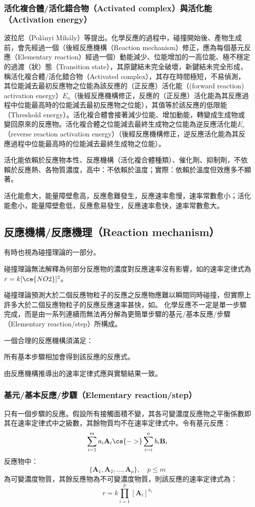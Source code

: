 \documentclass[a4paper,12pt]{report}
\begin{document}
\subsubsection{活化複合體/活化錯合物（Activated complex）與活化能（Activation energy）}
波拉尼（Polányi Mihály）等提出。化學反應的過程中，碰撞開始後、產物生成前，會先經過一個（後經反應機構（Reaction mechanism）修正，應為每個基元反應（Elementary reaction）經過一個）動能減少、位能增加的一高位能、極不穩定的過渡（狀）態（Transition state），其原鍵結未完全破壞，新鍵結未完全形成，稱活化複合體/活化錯合物（Activated complex），其存在時間極短，不易偵測，其位能減去最初反應物之位能為該反應的（正反應）活化能（(forward reaction) activation energy）$E_a$（後經反應機構修正，反應的（正反應）活化能為其反應過程中位能最高時的位能減去最初反應物之位能），其值等於該反應的低限能（Threshold energy）。活化複合體會接著減少位能、增加動能，轉變成生成物或變回原來的反應物。活化複合體之位能減去最終生成物之位能為逆反應活化能$E_r$（reverse reaction activation energy）（後經反應機構修正，逆反應活化能為其反應過程中位能最高時的位能減去最終生成物之位能）。

活化能依賴於反應物本性、反應機構（活化複合體種類）、催化劑、抑制劑，不依賴於反應熱、各物質濃度，高中：不依賴於溫度；實際：依賴於溫度但效應多不顯著。

活化能愈大，能量障壁愈高，反應愈難發生，反應速率愈慢，速率常數愈小；活化能愈小，能量障壁愈低，反應愈易發生，反應速率愈快，速率常數愈大。
\subsection{反應機構/反應機理（Reaction mechanism）}
有時也視為碰撞理論的一部分。
\bit
\item 碰撞理論無法解釋為何部分反應物的濃度對反應速率沒有影響，如的速率定律式為$r=k[\ce{NO2}]^2$。
\item 碰撞理論預測大於二個反應物粒子的反應之反應物應難以瞬間同時碰撞，但實際上許多大於二個反應物粒子的反應反應速率甚快，如。
\eit
{}
化學反應不一定是單一步驟完成，而是由一系列連續而無法再分解為更簡單步驟的基元/基本反應/步驟（Elementary reaction/step）所構成。

一個合理的反應機構須滿足：
\bit
\item 所有基本步驟相加會得到該反應的反應式。
\item 由反應機構推導出的速率定律式應與實驗結果一致。
\eit
\subsubsection{基元/基本反應/步驟（Elementary reaction/step）}
只有一個步驟的反應。假設所有接觸面積不變，其各可變濃度反應物之平衡係數即其在速率定律式中之級數，其餘物質均不在速率定律式中。令有基元反應：
\[\sum_{i=1}^ma_i\mathbf{A}_i\ce{->}\sum_{i=i}^nb_i\mathbf{B}_i\]
反應物中：
\[\{\mathbf{A}_1,\mathbf{A}_2,\ldots,\mathbf{A}_p\},\quad p\leq m\]
為可變濃度物質，其餘反應物為不可變濃度物質，則該反應的速率定律式為：
\[r=k\prod_{i=1}^p[\mathbf{A}_i]^{a_i}\]
\end{document}
